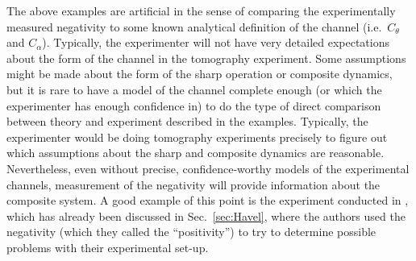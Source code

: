 The above examples are artificial in the sense of comparing the experimentally measured negativity to some known analytical definition of the channel (i.e.\ $C_\theta$ and $C_\alpha$).  Typically, the experimenter will not have very detailed expectations about the form of the channel in the tomography experiment.  Some assumptions might be made about the form of the sharp operation or composite dynamics, but it is rare to have a model of the channel complete enough (or which the experimenter has enough confidence in) to do the type of direct comparison between theory and experiment described in the examples.  Typically, the experimenter would be doing tomography experiments precisely to figure out which assumptions about the sharp and composite dynamics are reasonable.  Nevertheless, even without precise, confidence-worthy models of the experimental channels, measurement of the negativity will provide information about the composite system.  A good example of this point is the experiment conducted in \cite{Cory2004}, which has already been discussed in Sec.\ \ref{sec:Havel}, where the authors used the negativity (which they called the ``positivity'') to try to determine possible problems with their experimental set-up. 

